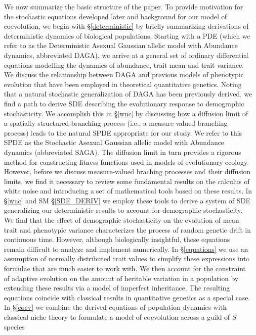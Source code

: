\documentclass[]{article}
\begin{document}
We now summarize the basic structure of the paper. To provide motivation
for the stochastic equations developed later and background for our
model of coevolution, we begin with \S\ref{deterministic} by briefly
summarizing derivations of deterministic dynamics of biological
populations. Starting with a PDE (which we refer to as the Deterministic
Asexual Gaussian allelic model with Abundance dynamics, abbreviated
DAGA), we arrive at a general set of ordinary differential equations
modelling the dynamics of abundance, trait mean and trait variance. We
discuss the relationship between DAGA and previous models of phenotypic
evolution that have been employed in theoretical quantitative genetics.
Noting that a natural stochastic generalization of DAGA has been
previously derived, we find a path to derive SDE describing the
evolutionary response to demographic stochasticity. We accomplish this
in \S\ref{wnc} by discussing how a diffusion limit of a spatially
structured branching process (i.e., a measure-valued branching process)
leads to the natural SPDE appropriate for our study. We refer to this
SPDE as the Stochastic Asexual Gaussian allelic model with Abundance
dynamics (abbreviated SAGA). The diffusion limit in turn provides a
rigorous method for constructing fitness functions used in models of
evolutionary ecology. However, before we discuss measure-valued braching
processes and their diffusion limits, we find it necessary to review
some fundamental results on the calculus of white noise and introducing
a set of mathematical tools based on these results. In \S\ref{wnc} and
SM \S\ref{SDE_DERIV} we employ these tools to derive a system of SDE
generalizing our deterministic results to account for demographic
stochasticity. We find that the effect of demographic stochasticity on
the evolution of mean trait and phenotypic variance characterizes the
process of random genetic drift in continuous time. However, although
biologically insightful, these equations remain difficult to analyze and
implement numerically. In \S\ref{equations} we use an assumption of
normally distributed trait values to simplify these expressions into
formulae that are much easier to work with. We then account for the
constraint of adaptive evolution on the amount of heritable variation in
a population by extending these results via a model of imperfect
inheritance. The resulting equations coincide with classical results in
quantitative genetics as a special case. In \S\ref{coev} we combine the
derived equations of population dynamics with classical niche theory to
formulate a model of coevolution across a guild of \(S\) species
\end{document}
